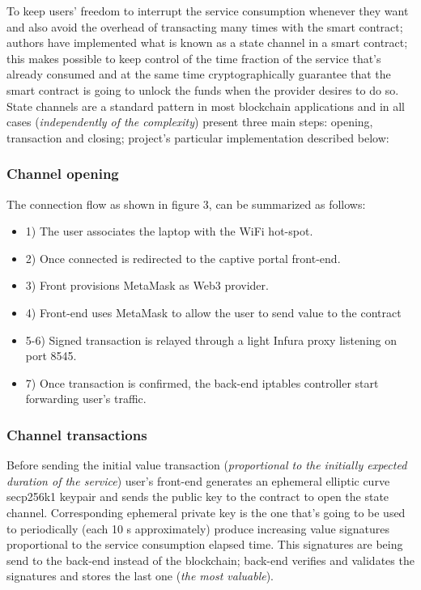 \documentclass[12pt]{amsart}
\begin{document}
\begin{multicols}{2}
\vspace{0.35cm}

To keep users' freedom to interrupt the service consumption
whenever they want and also avoid the overhead of transacting
many times with the smart contract; authors have implemented
what is known as a state channel in a smart contract; this
makes possible to keep control of the time fraction of the service
that's already consumed and at the same time cryptographically
guarantee that the smart contract is going to unlock the funds
when the provider desires to do so. State channels are a
standard pattern in most blockchain applications and in all cases
(\textit{independently of the complexity}) present three main
steps: opening, transaction and closing; project's particular implementation
described below:

\subsubsection{Channel opening}
The connection flow as shown in figure 3, can be summarized
as follows:

\begin{itemize}
\item[] 1) The user associates the laptop with the WiFi hot-spot.
\item[] 2) Once connected is redirected to the captive portal front-end.
\item[] 3) Front provisions MetaMask as Web3 provider.
\item[] 4) Front-end uses MetaMask to allow the user
  to send value to the contract
\item[] 5-6) Signed transaction is relayed through a light Infura proxy listening
  on port 8545.
\item[] 7) Once transaction is confirmed, the back-end iptables controller
  start forwarding user's traffic.
\end{itemize}


\subsubsection{Channel transactions}
Before sending the initial value transaction (\textit{proportional to
  the initially expected duration of the service})
user's front-end generates an ephemeral elliptic curve
secp256k1 keypair and sends the public key to the contract to open the state channel.
Corresponding ephemeral private key is the one that's going to be used
to periodically (each 10 s approximately)
produce increasing value signatures proportional to the
service consumption elapsed time. This signatures are being send to the
back-end instead of the blockchain; back-end verifies and validates the
signatures and stores the last one (\textit{the most valuable}).


\end{multicols}
\end{document}
